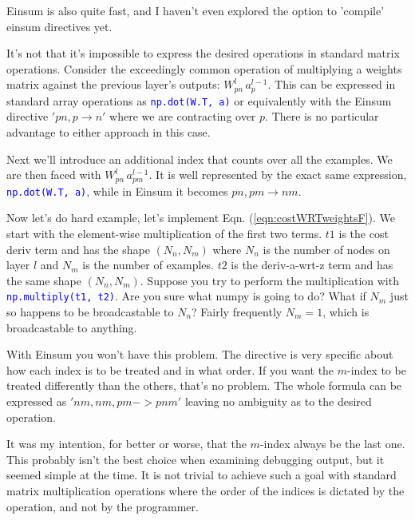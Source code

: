 \documentclass[twocolumn]{revtex4-1}
\newcommand{\code}[1]{\textcolor{blue}{\lstinline{#1}}}
\begin{document}
Einsum is also quite fast, and I haven't even explored the option to 'compile' einsum directives yet.

It's not that it's impossible to express the desired operations in standard matrix operations. Consider the exceedingly common operation of multiplying a weights matrix against the previous layer's outputs: $W^l_{p n} \, a^{l - 1}_p$. This can be expressed in standard array operations as \code{np.dot(W.T, a)} or equivalently with the Einsum directive $'pn,p \rightarrow n'$ where we are contracting over $p$. There is no particular advantage to either approach in this case.

Next we'll introduce an additional index that counts over all the examples. We are then faced with $W^l_{p n} \, a^{l - 1}_{p m}$. It is well represented by the exact same expression, \code{np.dot(W.T, a)}, while in Einsum it becomes $pn,pm \rightarrow nm$. 

Now let's do hard example, let's implement Eqn. (\ref{eqn:costWRTweightsF}). We start with the element-wise multiplication of the first two terms. $t1$ is the cost deriv term and has the shape $(N_n, N_m)$ where $N_n$ is the number of nodes on layer $l$ and $N_m$ is the number of examples. $t2$ is the deriv-a-wrt-z term and has the same shape $(N_n, N_m)$. Suppose you try to perform the multiplication with \code{np.multiply(t1, t2)}. Are you sure what numpy is going to do? What if $N_m$ just so happens to be broadcastable to $N_n$? Fairly frequently $N_m = 1$, which is broadcastable to anything.

With Einsum you won't have this problem. The directive is very specific about how each index is to be treated and in what order. If you want the $m$-index to be treated differently than the others, that's no problem. The whole formula can be expressed as $'nm,nm,pm -> pnm'$ leaving no ambiguity as to the desired operation. 

It was my intention, for better or worse, that the $m$-index always be the last one. This probably isn't the best choice when examining debugging output, but it seemed simple at the time. It is not trivial to achieve such a goal with standard matrix multiplication operations where the order of the indices is dictated by the operation, and not by the programmer.
\end{document}
